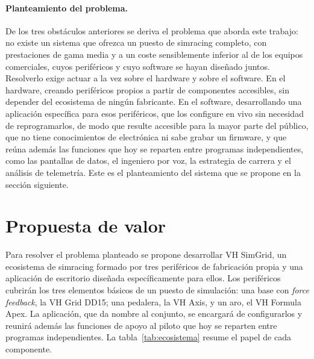 \paragraph{Planteamiento del problema.}
De los tres obstáculos anteriores se deriva el problema que aborda este trabajo: no existe un sistema que ofrezca un puesto de simracing completo, con prestaciones de gama media y a un coste sensiblemente inferior al de los equipos comerciales, cuyos periféricos y cuyo software se hayan diseñado juntos. Resolverlo exige actuar a la vez sobre el hardware y sobre el software. En el hardware, creando periféricos propios a partir de componentes accesibles, sin depender del ecosistema de ningún fabricante. En el software, desarrollando una aplicación específica para esos periféricos, que los configure en vivo sin necesidad de reprogramarlos, de modo que resulte accesible para la mayor parte del público, que no tiene conocimientos de electrónica ni sabe grabar un firmware, y que reúna además las funciones que hoy se reparten entre programas independientes, como las pantallas de datos, el ingeniero por voz, la estrategia de carrera y el análisis de telemetría. Este es el planteamiento del sistema que se propone en la sección siguiente.


\section{Propuesta de valor}
\label{sec:propuesta}

Para resolver el problema planteado se propone desarrollar VH SimGrid, un ecosistema de simracing formado por tres periféricos de fabricación propia y una aplicación de escritorio diseñada específicamente para ellos. Los periféricos cubrirán los tres elementos básicos de un puesto de simulación: una base con \textit{force feedback}, la VH Grid DD15; una pedalera, la VH Axis, y un aro, el VH Formula Apex. La aplicación, que da nombre al conjunto, se encargará de configurarlos y reunirá además las funciones de apoyo al piloto que hoy se reparten entre programas independientes. La tabla~\ref{tab:ecosistema} resume el papel de cada componente.

